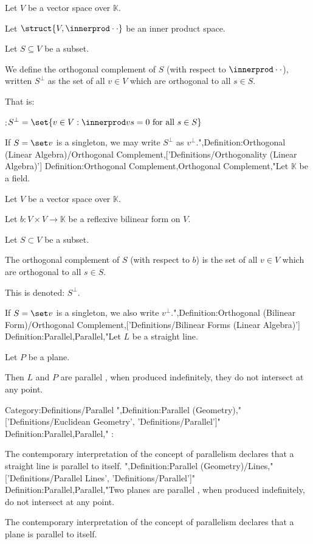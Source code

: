 Let $V$ be a vector space over $\mathbb K$.

Let $\struct {V, \innerprod \cdot \cdot}$ be an inner product space.

Let $S\subseteq V$ be a subset.


We define the orthogonal complement of $S$ (with respect to $\innerprod \cdot \cdot$), written $S^\perp$ as the set of all $v \in V$ which are orthogonal to all $s \in S$.

That is: 

:$S^\perp = \set {v \in V : \innerprod v s = 0 \text { for all } s \in S}$


If $S = \set v$ is a singleton, we may write $S^\perp$ as $v^\perp$.",Definition:Orthogonal (Linear Algebra)/Orthogonal Complement,['Definitions/Orthogonality (Linear Algebra)']
Definition:Orthogonal Complement,Orthogonal Complement,"Let $\mathbb K$ be a field.

Let $V$ be a vector space over $\mathbb K$.

Let $b : V\times V \to \mathbb K$ be a reflexive bilinear form on $V$.

Let $S\subset V$ be a subset.


The orthogonal complement of $S$ (with respect to $b$) is the set of all $v \in V$ which are orthogonal to all $s \in S$.


This is denoted: $S^\perp$.

If $S = \set v$ is a singleton, we also write $v^\perp$.",Definition:Orthogonal (Bilinear Form)/Orthogonal Complement,['Definitions/Bilinear Forms (Linear Algebra)']
Definition:Parallel,Parallel,"Let $L$ be a straight line.

Let $P$ be a plane.

Then $L$ and $P$ are parallel , when produced indefinitely, they do not intersect at any point.


Category:Definitions/Parallel
",Definition:Parallel (Geometry),"['Definitions/Euclidean Geometry', 'Definitions/Parallel']"
Definition:Parallel,Parallel,"
:


The contemporary interpretation of the concept of parallelism declares that a straight line is parallel to itself.
",Definition:Parallel (Geometry)/Lines,"['Definitions/Parallel Lines', 'Definitions/Parallel']"
Definition:Parallel,Parallel,"Two planes are parallel , when produced indefinitely, do not intersect at any point.





The contemporary interpretation of the concept of parallelism declares that a plane is parallel to itself.

